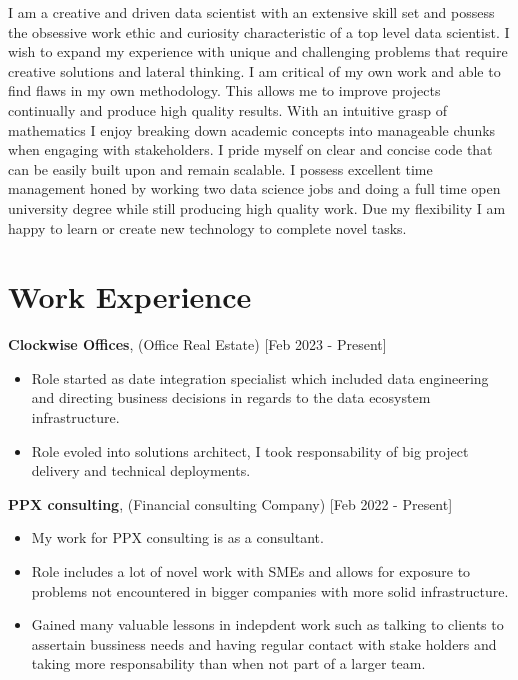 \documentclass[10pt]{article}
\begin{document}
{I am a creative and driven data scientist with an extensive skill set and possess the obsessive work ethic and curiosity characteristic of a top level data scientist.
I wish to expand my experience with unique and challenging problems that require creative solutions
and lateral thinking.
\newline
I am critical of my own work and able to find flaws in my own methodology. This allows me to
improve projects continually and produce high quality results.
With an intuitive grasp of mathematics I enjoy breaking down academic concepts into manageable chunks when engaging with stakeholders.
\newline
I pride myself on clear and concise code that can be easily built upon and remain scalable.
\newline
I possess excellent time management honed by working two data science jobs and doing a full time open
university degree while still producing high quality work.
Due my flexibility I am happy to learn or create new technology to complete novel tasks.





\section*{\bf Work Experience}

{\bf Clockwise Offices}, (Office Real Estate) [Feb 2023 - Present]
\begin{itemize}
\setlength{\itemsep}{0.10ex}
\item Role started as date integration specialist which included data engineering and directing business decisions in regards to the data ecosystem infrastructure.
\item Role evoled into solutions architect, I took responsability of big project delivery and technical deployments.

\end{itemize}

{\bf PPX consulting}, (Financial consulting Company) [Feb 2022 - Present]
\begin{itemize}
\setlength{\itemsep}{0.10ex}
\item My work for PPX consulting is as a consultant.
\item Role includes a lot of novel work with SMEs and allows for exposure to problems not encountered in bigger companies with more solid infrastructure.
\item Gained many valuable lessons in indepdent work such as talking to clients to assertain
bussiness needs and having regular contact with stake holders and taking more responsability than when not part of a larger team.


\end{itemize}}
\end{document}
